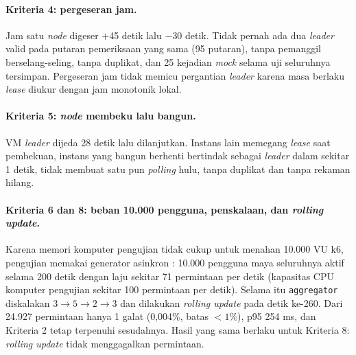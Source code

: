\paragraph*{Kriteria 4: pergeseran jam.}
Jam satu \textit{node} digeser +45 detik lalu $-30$ detik. Tidak pernah ada dua \textit{leader} valid pada putaran pemeriksaan yang sama (95 putaran), tanpa pemanggil berselang-seling, tanpa duplikat, dan 25 kejadian \textit{mock} selama uji seluruhnya tersimpan. Pergeseran jam tidak memicu pergantian \textit{leader} karena masa berlaku \textit{lease} diukur dengan jam monotonik lokal.

\paragraph*{Kriteria 5: \textit{node} membeku lalu bangun.}
VM \textit{leader} dijeda 28 detik lalu dilanjutkan. Instans lain memegang \textit{lease} saat pembekuan, instans yang bangun berhenti bertindak sebagai \textit{leader} dalam sekitar 1 detik, tidak membuat satu pun \textit{polling} hulu, tanpa duplikat dan tanpa rekaman hilang.

\paragraph*{Kriteria 6 dan 8: beban 10.000 pengguna, penskalaan, dan \textit{rolling update}.}
Karena memori komputer pengujian tidak cukup untuk menahan 10.000 VU k6, pengujian memakai generator asinkron : 10.000 pengguna maya seluruhnya aktif selama 200 detik dengan laju sekitar 71 permintaan per detik (kapasitas CPU komputer pengujian sekitar 100 permintaan per detik). Selama itu \texttt{aggregator} diskalakan $3 \to 5 \to 2 \to 3$ dan dilakukan \textit{rolling update} pada detik ke-260. Dari 24.927 permintaan hanya 1 galat (0,004\%, batas $< 1\%$), p95 254 ms, dan Kriteria 2 tetap terpenuhi sesudahnya. Hasil yang sama berlaku untuk Kriteria 8: \textit{rolling update} tidak menggagalkan permintaan.

